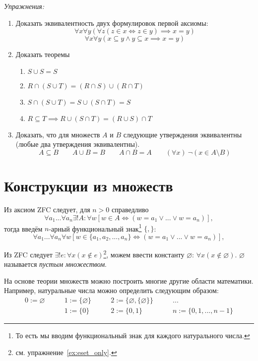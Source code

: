 \newcommand\eset{\varnothing}
\vspace{1em}
{\it Упражнения:}
\begin{enumerate}
	\item{}Доказать эквивалентность двух формулировок первой аксиомы:
	\[
		\forall x\forall y(\forall z(z\in x\iff z\in y)\implies x=y)
	\]
	\[
		\forall x\forall y(x\subseteq y\land y\subseteq x\implies x=y)
	\]

	\item{}Доказать теоремы
	\begin{fullwidth}
		\begin{multicols}{2}
			\begin{enumerate}
				\item{}$S\cup S=S$
				\item{}$R\cap (S\cup T)=(R\cap S)\cup (R\cap T)$
				\item{}$S\cap (S\cup T)=S\cup (S\cap T)=S$
				\item{}$R\subseteq T\implies R\cup (S\cap T)=(R\cup S)\cap T$
			\end{enumerate}
		\end{multicols}
	\end{fullwidth}

	\item{}Доказать, что для множеств $A$ и $B$ следующие утверждения эквивалентны
	(любые два утверждения эквивалентны).
	\[
		A\subseteq B\qquad A\cup B=B\qquad A\cap B=A
		\qquad (\forall x)~\lnot(x\in A\setminus B)
	\]
\end{enumerate}

\section{Конструкции из множеств}

Из аксиом ZFC следует, для $n>0$ справедливо
\[
	\forall a_1...\forall a_{n}\exists !A:\forall w
		[w\in A\iff (w=a_1\lor...\lor w=a_{n})],
\]
тогда введём $n$-арный функциональный знак\footnote{
	То есть мы вводим функциональный знак для каждого натурального числа.
} $\{,\}$:
\[
	\forall a_1...\forall a_{n}\forall w
	[w\in \{a_1,a_2,...,a_{n}\}\iff (w=a_1\lor ...\lor w=a_{n})],
\]

Из ZFC следует ${\exists !e:\forall x(x\notin e)}$\footnote{
	см. упражнение~\ref{ex:eset_only}.
}, можем ввести константу $\eset$: $\forall x(x\notin \eset)$.
$\eset$ называется {\it пустым множеством}.

На основе теории множеств можно построить многие другие области математики.
Например, натуральные числа можно определить следующим образом:
\[ \begin{array}{llll}
		0 :=\eset\qquad & 1  :=\{\eset\}\qquad & 2  :=\{\eset,\{\eset\}\}\qquad & ... \\
		                & 1:=\{0\}\qquad       & 2:=\{0,1\}
		                & n:=\{0,1,...,n-1\}
	\end{array}
\]

